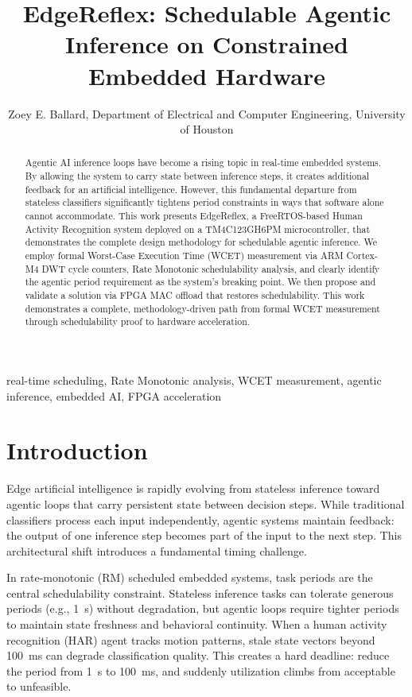 \documentclass[conference]{IEEEtran}
\begin{document}
\title{EdgeReflex: Schedulable Agentic Inference on Constrained Embedded Hardware}

\author{Zoey E. Ballard, Department of Electrical and Computer Engineering, University of Houston}

\maketitle

\begin{abstract} 
Agentic AI inference loops have become a rising topic in real-time embedded systems. By allowing the system to carry state between inference steps, it creates additional feedback for an artificial intelligence. However, this fundamental departure from stateless classifiers significantly tightens period constraints in ways that software alone cannot accommodate. This work presents EdgeReflex, a FreeRTOS-based Human Activity Recognition system deployed on a TM4C123GH6PM microcontroller, that demonstrates the complete design methodology for schedulable agentic inference. We employ formal Worst-Case Execution Time (WCET) measurement via ARM Cortex-M4 DWT cycle counters, Rate Monotonic schedulability analysis, and clearly identify the agentic period requirement as the system's breaking point. We then propose and validate a solution via FPGA MAC offload that restores schedulability. This work demonstrates a complete, methodology-driven path from formal WCET measurement through schedulability proof to hardware acceleration. 
\end{abstract} 

\begin{IEEEkeywords} 
real-time scheduling, Rate Monotonic analysis, WCET measurement, agentic inference, embedded AI, FPGA acceleration \end{IEEEkeywords}

\section{Introduction}

Edge artificial intelligence is rapidly evolving from stateless inference toward agentic loops that carry persistent state between decision steps. While traditional classifiers process each input independently, agentic systems maintain feedback: the output of one inference step becomes part of the input to the next step. This architectural shift introduces a fundamental timing challenge.

In rate-monotonic (RM) scheduled embedded systems, task periods are the central schedulability constraint. Stateless inference tasks can tolerate generous periods (e.g., 1~s) without degradation, but agentic loops require tighter periods to maintain state freshness and behavioral continuity. When a human activity recognition (HAR) agent tracks motion patterns, stale state vectors beyond 100~ms can degrade classification quality. This creates a hard deadline: reduce the period from 1~s to 100~ms, and suddenly utilization climbs from acceptable to unfeasible.
\end{document}
